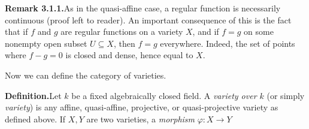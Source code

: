 {\smallskip
\noindent\hypertarget{result-I-3.1.1}{}\textbf{Remark 3.1.1.}\enspace As in the quasi-affine case, a regular function is necessarily continuous (proof left to reader). An important consequence of this is the fact that if $f$ and $g$ are regular functions on a variety $X$, and if $f=g$ on some nonempty open subset $U\subseteq X$, then $f=g$ everywhere. Indeed, the set of points where $f-g=0$ is closed and dense, hence equal to $X$.

\smallskip
Now we can define the category of varieties.

\smallskip
\noindent\textbf{Definition.}\enspace Let $k$ be a fixed algebraically closed field. A \emph{variety over $k$} (or simply \emph{variety}) is any affine, quasi-affine, projective, or quasi-projective variety as defined above. If $X,Y$ are two varieties, a \emph{morphism} $\varphi\colon X\to Y$}
\EndSheet
